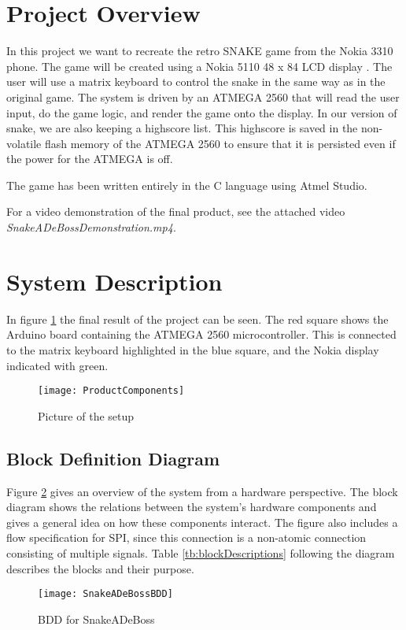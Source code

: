 \section{Project Overview}
	In this project we want to recreate the retro SNAKE game from the Nokia 3310 phone. The game will be created using a Nokia 5110 48 x 84 LCD display \cite{NokiaDisplay}. The user will use a matrix keyboard to control the snake in the same way as in the original game. The system is driven by an ATMEGA 2560 that will read the user input, do the game logic, and render the game onto the display. In our version of snake, we are also keeping a highscore list. This highscore is saved in the non-volatile flash memory of the ATMEGA 2560 to ensure that it is persisted even if the power for the ATMEGA is off.
	
	The game has been written entirely in the C language using Atmel Studio.
	
	For a video demonstration of the final product, see the attached video \textit{SnakeADeBossDemonstration.mp4}.

\section{System Description}
	In figure \ref{ProductComponents} the final result of the project can be seen. The red square shows the Arduino board containing the ATMEGA 2560 microcontroller. This is connected to the matrix keyboard highlighted in the blue square, and the Nokia display indicated with green. 
	
	\begin{figure}[H]
		\texttt{[image: ProductComponents]}
		\centering
		\caption{Picture of the setup}
		\label{ProductComponents}
	\end{figure}


	\subsection{Block Definition Diagram}
		Figure \ref{fig:bdd} gives an overview of the system from a hardware perspective. The block diagram shows the relations between the system's hardware components and gives a general idea on how these components interact. The figure also includes a flow specification for SPI, since this connection is a non-atomic connection consisting of multiple signals. Table \ref{tb:blockDescriptions} following the diagram describes the blocks and their purpose.
		
		\begin{figure}[H]
			\texttt{[image: SnakeADeBossBDD]}
			\centering
			\caption{BDD for SnakeADeBoss}
			\label{fig:bdd}
		\end{figure}
		
